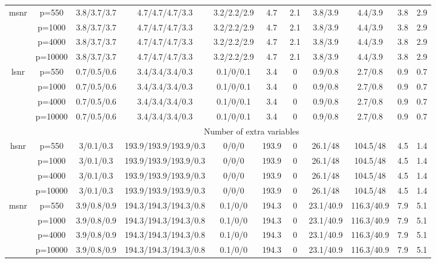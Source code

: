\begin{table}[ht]
{\begin{tabular}{|c|c|ccccccccc|}
  \midrule\multirow{4}[2]{*}{msnr} & p=550 & 3.8/3.7/3.7 & 4.7/4.7/4.7/3.3 & 3.2/2.2/2.9 & 4.7 & 2.1 & 3.8/3.9 & 4.4/3.9 & 3.8 & 2.9 \\ 
   & p=1000 & 3.8/3.7/3.7 & 4.7/4.7/4.7/3.3 & 3.2/2.2/2.9 & 4.7 & 2.1 & 3.8/3.9 & 4.4/3.9 & 3.8 & 2.9 \\ 
   & p=4000 & 3.8/3.7/3.7 & 4.7/4.7/4.7/3.3 & 3.2/2.2/2.9 & 4.7 & 2.1 & 3.8/3.9 & 4.4/3.9 & 3.8 & 2.9 \\ 
   & p=10000 & 3.8/3.7/3.7 & 4.7/4.7/4.7/3.3 & 3.2/2.2/2.9 & 4.7 & 2.1 & 3.8/3.9 & 4.4/3.9 & 3.8 & 2.9 \\ 
  \midrule\multirow{4}[2]{*}{lsnr} & p=550 & 0.7/0.5/0.6 & 3.4/3.4/3.4/0.3 & 0.1/0/0.1 & 3.4 & 0 & 0.9/0.8 & 2.7/0.8 & 0.9 & 0.7 \\ 
   & p=1000 & 0.7/0.5/0.6 & 3.4/3.4/3.4/0.3 & 0.1/0/0.1 & 3.4 & 0 & 0.9/0.8 & 2.7/0.8 & 0.9 & 0.7 \\ 
   & p=4000 & 0.7/0.5/0.6 & 3.4/3.4/3.4/0.3 & 0.1/0/0.1 & 3.4 & 0 & 0.9/0.8 & 2.7/0.8 & 0.9 & 0.7 \\ 
   & p=10000 & 0.7/0.5/0.6 & 3.4/3.4/3.4/0.3 & 0.1/0/0.1 & 3.4 & 0 & 0.9/0.8 & 2.7/0.8 & 0.9 & 0.7 \\ 
   \midrule 
 \multicolumn{1}{|c}{} &       & \multicolumn{9}{c|}{Number of extra variables} \\
\midrule\multirow{4}[2]{*}{hsnr} & p=550 & 3/0.1/0.3 & 193.9/193.9/193.9/0.3 & 0/0/0 & 193.9 & 0 & 26.1/48 & 104.5/48 & 4.5 & 1.4 \\ 
   & p=1000 & 3/0.1/0.3 & 193.9/193.9/193.9/0.3 & 0/0/0 & 193.9 & 0 & 26.1/48 & 104.5/48 & 4.5 & 1.4 \\ 
   & p=4000 & 3/0.1/0.3 & 193.9/193.9/193.9/0.3 & 0/0/0 & 193.9 & 0 & 26.1/48 & 104.5/48 & 4.5 & 1.4 \\ 
   & p=10000 & 3/0.1/0.3 & 193.9/193.9/193.9/0.3 & 0/0/0 & 193.9 & 0 & 26.1/48 & 104.5/48 & 4.5 & 1.4 \\ 
  \midrule\multirow{4}[2]{*}{msnr} & p=550 & 3.9/0.8/0.9 & 194.3/194.3/194.3/0.8 & 0.1/0/0 & 194.3 & 0 & 23.1/40.9 & 116.3/40.9 & 7.9 & 5.1 \\ 
   & p=1000 & 3.9/0.8/0.9 & 194.3/194.3/194.3/0.8 & 0.1/0/0 & 194.3 & 0 & 23.1/40.9 & 116.3/40.9 & 7.9 & 5.1 \\ 
   & p=4000 & 3.9/0.8/0.9 & 194.3/194.3/194.3/0.8 & 0.1/0/0 & 194.3 & 0 & 23.1/40.9 & 116.3/40.9 & 7.9 & 5.1 \\ 
   & p=10000 & 3.9/0.8/0.9 & 194.3/194.3/194.3/0.8 & 0.1/0/0 & 194.3 & 0 & 23.1/40.9 & 116.3/40.9 & 7.9 & 5.1 \\ 

\end{tabular}}
\end{table}
